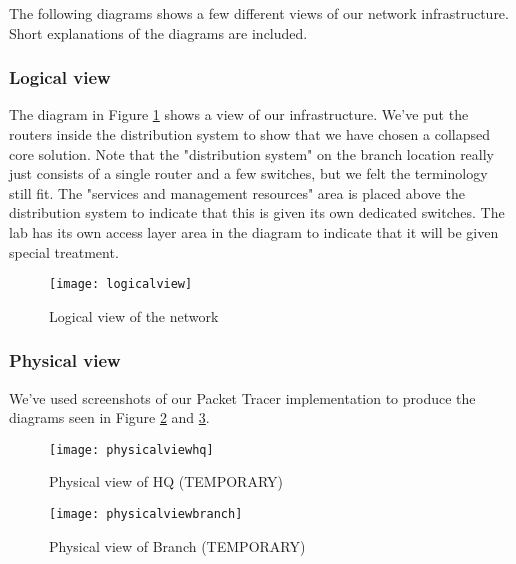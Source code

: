 The following diagrams shows a few different views of our network infrastructure. Short explanations of the diagrams are included.

\subsubsection{Logical view}


The diagram in Figure \ref{logicalview} shows a view of our infrastructure. We've put the routers inside the distribution system to show that we have chosen a collapsed core solution. Note that the "distribution system" on the branch location really just consists of a single router and a few switches, but we felt the terminology still fit. The "services and management resources" area is placed above the distribution system to indicate that this is given its own dedicated switches. The lab has its own access layer area in the diagram to indicate that it will be given special treatment.

\begin{figure}[H]
\caption{Logical view of the network}
\centering
\texttt{[image: logicalview]}
\label{logicalview}
\end{figure}

\subsubsection{Physical view}

We've used screenshots of our Packet Tracer implementation to produce the diagrams seen in Figure \ref{physicalviewhq} and \ref{physicalviewbranch}.



\begin{figure}[H]
\caption{Physical view of HQ (TEMPORARY)}
\centering
\texttt{[image: physicalviewhq]}
\label{physicalviewhq}
\end{figure}

\begin{figure}[H]
\caption{Physical view of Branch (TEMPORARY)}
\centering
\texttt{[image: physicalviewbranch]}
\label{physicalviewbranch}
\end{figure}


